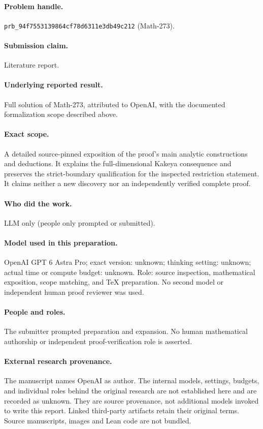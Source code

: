 \documentclass[11pt,a4paper]{article}
\numberwithin{equation}{section}
\theoremstyle{definition}
\theoremstyle{remark}
\begin{document}
\paragraph{Problem handle.} \texttt{prb\_94f7553139864cf78d6311e3db49c212}
(Math-273).
\paragraph{Submission claim.} Literature report.
\paragraph{Underlying reported result.} Full solution of Math-273, attributed to
OpenAI, with the documented formalization scope described above.
\paragraph{Exact scope.} A detailed source-pinned exposition of the proof's main
analytic constructions and deductions. It explains the full-dimensional Kakeya
consequence and preserves the strict-boundary qualification for the inspected
restriction statement. It claims neither a new discovery nor an independently
verified complete proof.
\paragraph{Who did the work.} LLM only (people only prompted or submitted).
\paragraph{Model used in this preparation.} OpenAI GPT 6 Astra Pro; exact version:
unknown; thinking setting: unknown; actual time or compute budget: unknown.
Role: source inspection, mathematical exposition, scope matching, and TeX
preparation. No second model or independent human proof reviewer was used.
\paragraph{People and roles.} The submitter prompted preparation and expansion. No human mathematical authorship or independent proof-verification role is asserted.
\paragraph{External research provenance.} The manuscript names OpenAI as author.
The internal models, settings, budgets, and individual roles behind the original
research are not established here and are recorded as unknown. They are source
provenance, not additional models invoked to write this report.
Linked third-party artifacts retain their original terms. Source manuscripts, images and Lean code are not bundled.
\end{document}

